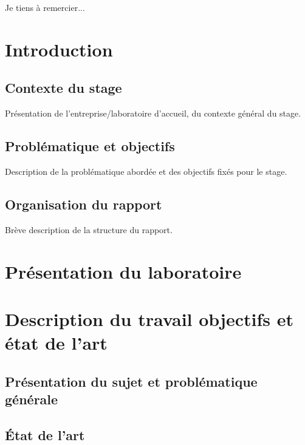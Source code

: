 \documentclass[11pt]{article}
\theoremstyle{definition}
\theoremstyle{remark}
\begin{document}
Je tiens à remercier...
\newpage

\tableofcontents

\newpage

\listoffigures
{}

\newpage

\listoftables
{}

\newpage

\section{Introduction}

\subsection{Contexte du stage}
Présentation de l'entreprise/laboratoire d'accueil, du contexte général du stage.

\subsection{Problématique et objectifs}
Description de la problématique abordée et des objectifs fixés pour le stage.

\subsection{Organisation du rapport}
Brève description de la structure du rapport.

\newpage
\section{Présentation du laboratoire}


\newpage
\section{Description du travail objectifs et état de l'art}
    
    \subsection{Présentation du sujet et problématique générale}
    
    \subsection{État de l'art}
\end{document}
